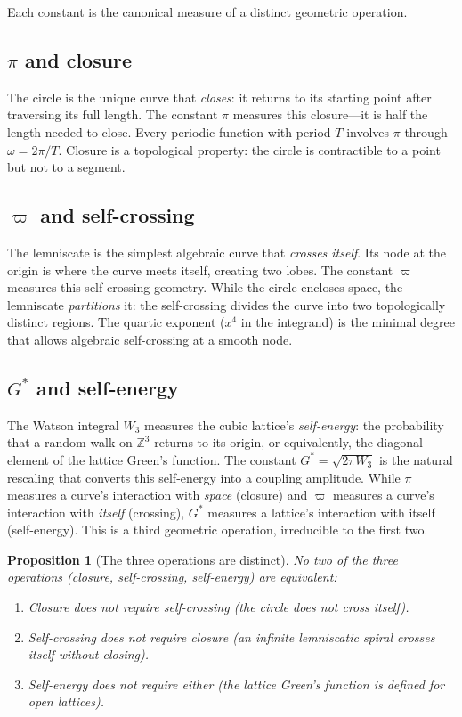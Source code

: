 \documentclass[12pt]{article}
\newtheorem{proposition}[theorem]{Proposition}
\theoremstyle{definition}
\theoremstyle{remark}
\begin{document}
Each constant is the canonical measure of a distinct geometric operation.

\subsection{$\pi$ and closure}

The circle is the unique curve that \emph{closes}: it returns to its starting point after traversing its full length. The constant $\pi$ measures this closure---it is half the length needed to close. Every periodic function with period $T$ involves $\pi$ through $\omega = 2\pi/T$. Closure is a topological property: the circle is contractible to a point but not to a segment.

\subsection{$\varpi$ and self-crossing}

The lemniscate is the simplest algebraic curve that \emph{crosses itself}. Its node at the origin is where the curve meets itself, creating two lobes. The constant $\varpi$ measures this self-crossing geometry. While the circle encloses space, the lemniscate \emph{partitions} it: the self-crossing divides the curve into two topologically distinct regions. The quartic exponent ($x^4$ in the integrand) is the minimal degree that allows algebraic self-crossing at a smooth node.

\subsection{$G^*$ and self-energy}

The Watson integral $W_3$ measures the cubic lattice's \emph{self-energy}: the probability that a random walk on $\mathbb{Z}^3$ returns to its origin, or equivalently, the diagonal element of the lattice Green's function. The constant $G^* = \sqrt{2\pi W_3}$ is the natural rescaling that converts this self-energy into a coupling amplitude. While $\pi$ measures a curve's interaction with \emph{space} (closure) and $\varpi$ measures a curve's interaction with \emph{itself} (crossing), $G^*$ measures a lattice's interaction with itself (self-energy). This is a third geometric operation, irreducible to the first two.

\begin{proposition}[The three operations are distinct]
\label{prop:distinct}
No two of the three operations (closure, self-crossing, self-energy) are equivalent:
\begin{enumerate}[nosep]
    \item Closure does not require self-crossing (the circle does not cross itself).
    \item Self-crossing does not require closure (an infinite lemniscatic spiral crosses itself without closing).
    \item Self-energy does not require either (the lattice Green's function is defined for open lattices).
\end{enumerate}
\end{proposition}
\end{document}
